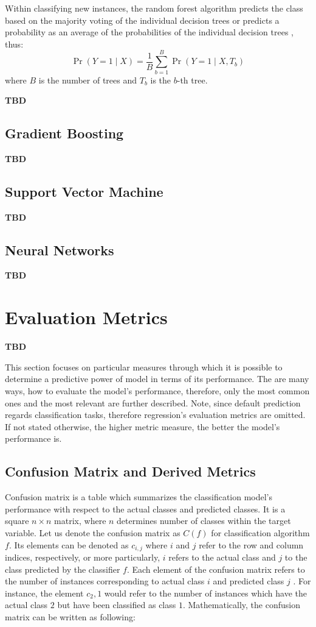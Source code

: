 Within classifying new instances, the random forest algorithm predicts the class based on the majority voting of the individual decision trees or predicts a probability as an average of the probabilities of the individual decision trees \citep{randomforestmalley}, thus:
\begin{equation}
    \operatorname{Pr}\left(Y=1 \mid X \right) = \frac{1}{B} \sum_{b=1}^{B} \operatorname{Pr}\left(Y=1 \mid X, T_b \right)
\end{equation}
where $B$ is the number of trees and $T_b$ is the $b$-th tree.

\textbf{TBD}
\subsection{Gradient Boosting}

\textbf{TBD}
\subsection{Support Vector Machine}

\textbf{TBD}
\subsection{Neural Networks}

\textbf{TBD}

\section{Evaluation Metrics}

\textbf{TBD}

This section focuses on particular measures through which it is possible to determine a predictive power of model in terms of its performance.
The are many ways, how to evaluate the model's performance, therefore, only the most common ones and the most relevant are further described.
Note, since default prediction regards classification tasks, therefore regression's evaluation metrics are omitted.
If not stated otherwise, the higher metric measure, the better the model's performance is.
\subsection{Confusion Matrix and Derived Metrics}


Confusion matrix is a table which summarizes the classification model's performance with respect to the actual classes and predicted classes.
It is a square $n \times n$ matrix, where $n$ determines number of classes within the target variable.
Let us denote the confusion matrix as $C\left(f\right)$ for classification algorithm $f$. 
Its elements can be denoted as $c_{i,j}$ where $i$ and $j$ refer to the row and column indices, respectively, or more particularly, $i$ refers to the actual class and $j$ to the class predicted by the classifier $f$.
Each element of the confusion matrix refers to the number of instances corresponding to actual class $i$ and predicted class $j$ \citep{japkowicz2011evaluating}. For instance, the element $c_2,1$ would refer to the number of instances which have the actual class $2$ but have been classified as class $1$.
Mathematically, the confusion matrix can be written as following:

